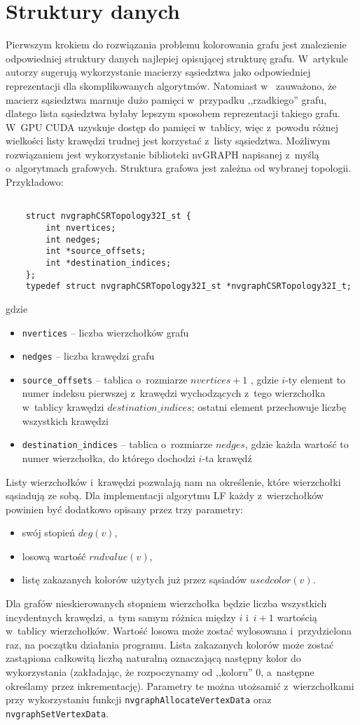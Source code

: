 \documentclass{article}
\begin{document}
	\section{Struktury danych}
	Pierwszym krokiem do rozwiązania problemu kolorowania grafu jest znalezienie odpowiedniej struktury danych najlepiej opisującej strukturę grafu. W~artykule \cite{Shen2017} autorzy sugerują wykorzystanie macierzy sąsiedztwa jako odpowiedniej reprezentacji dla skomplikowanych algorytmów. Natomiast w~\cite{SINGH20155} zauważono, że macierz sąsiedztwa marnuje dużo pamięci w~przypadku ,,rzadkiego'' grafu, dlatego lista sąsiedztwa byłaby lepszym sposobem reprezentacji takiego grafu. W~GPU CUDA uzyskuje dostęp do pamięci w~tablicy, więc z~powodu różnej wielkości listy krawędzi trudnej jest korzystać z~listy sąsiedztwa. Możliwym rozwiązaniem jest wykorzystanie biblioteki nvGRAPH napisanej z~myślą o~algorytmach grafowych. Struktura grafowa jest zależna od wybranej topologii. Przykładowo:
	\begin{lstlisting}
	
	struct nvgraphCSRTopology32I_st {
		int nvertices;
		int nedges;
		int *source_offsets;
		int *destination_indices;
	};
	typedef struct nvgraphCSRTopology32I_st *nvgraphCSRTopology32I_t;
	\end{lstlisting}
	gdzie
	\begin{itemize}
		\itemsep0em
		\item \texttt{nvertices} -- liczba wierzchołków grafu
		\item \texttt{nedges} -- liczba krawędzi grafu
		\item \texttt{source\_offsets} -- tablica o~rozmiarze $nvertices+1$ , gdzie $i$-ty element to numer indeksu pierwszej z~krawędzi wychodzących z~tego wierzchołka w~tablicy krawędzi $destination\_indices$; ostatni element przechowuje liczbę wszystkich krawędzi
		\item \texttt{destination\_indices} -- tablica o~rozmiarze $nedges$, gdzie każda wartość to numer wierzchołka, do którego dochodzi $i$-ta krawędź
	\end{itemize}
	Listy wierzchołków i~krawędzi pozwalają nam na określenie, które wierzchołki sąsiadują ze sobą. Dla implementacji algorytmu LF każdy z~wierzchołków powinien być dodatkowo opisany przez trzy parametry:
	\begin{itemize}
		\itemsep0em
		\item swój stopień $deg(v)$,
		\item losową wartość $rndvalue(v)$, 
		\item listę zakazanych kolorów użytych już przez sąsiadów $usedcolor(v)$. 
	\end{itemize}
	Dla grafów nieskierowanych stopniem wierzchołka będzie liczba wszystkich incydentnych krawędzi, a~tym samym różnica między $i$ i~$i+1$ wartością w~tablicy wierzchołków. Wartość losowa może zostać wylosowana i~przydzielona raz, na początku działania programu. Lista zakazanych kolorów może zostać zastąpiona całkowitą liczbą naturalną oznaczającą następny kolor do wykorzystania (zakładając, że rozpoczynamy od ,,koloru'' 0, a~następne określamy przez inkrementację). Parametry te można utożsamić z~wierzchołkami przy wykorzystaniu funkcji \texttt{nvgraphAllocateVertexData} oraz \texttt{nvgraphSetVertexData}.
	
\end{document}
